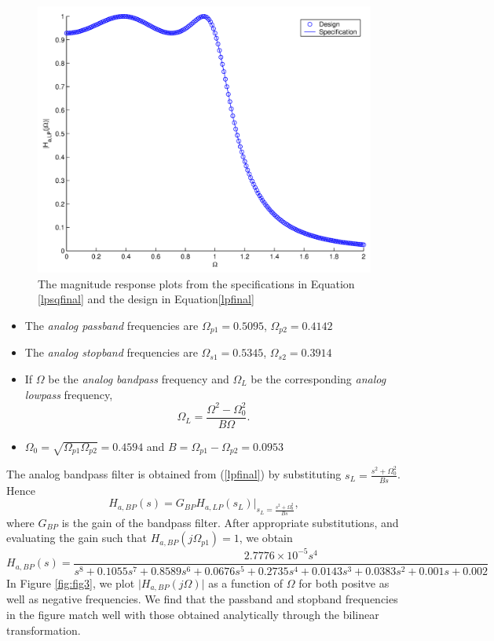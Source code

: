 \documentclass[journal,12pt,twocolumn]{IEEEtran}
\theoremstyle{remark}
\begin{document}
\begin{figure}[htbp] 
\centering
\includegraphics[width=1.1\columnwidth]{figs/PNG/IIR/fig2.png}
\caption{The magnitude response plots from the specifications in Equation \ref{lpsqfinal} and the design in Equation\eqref{lpfinal}}
\label{fig:fig2}
\end{figure}
 \begin{itemize}
\item The {\em analog  passband} frequencies are $\Omega_{p1} = 0.5095$, $\Omega_{p2} = 0.4142$
\item The {\em analog  stopband} frequencies are $\Omega_{s1} = 0.5345$, $\Omega_{s2} = 0.3914$
\item If $\Omega$ be the {\em analog bandpass} frequency and $\Omega_L$ be the corresponding {\em analog lowpass} frequency,
\begin{equation}
\Omega_L = \frac{\Omega^2 - \Omega_0^2}{B\Omega}.
\end{equation}

\item $\Omega_0 = \sqrt{\Omega_{p1}\Omega_{p2}} = 0.4594$ and $B = \Omega_{p1} - \Omega_{p2} = 0.0953$
\end{itemize}

The analog bandpass filter is obtained from (\ref{lpfinal}) by substituting
$s_L = \frac{s^2 + \Omega_0^2}{Bs}$.  Hence
\begin{equation}
H_{a,BP}(s) = G_{BP}H_{a,LP}(s_L)\vert_{s_L = \frac{s^2 + \Omega_0^2}{Bs}},
\end{equation}
where $G_{BP}$ is the gain of the bandpass filter.  After appropriate substitutions, and evaluating the gain 
such that $H_{a,BP}(j\Omega_{p1}) = 1$, we obtain
{\tiny
\begin{equation}
\label{bpfinal}
H_{a,BP}(s) = \frac{2.7776\times 10^{-5}s^4}{s^8+0.1055s^7+0.8589s^6+0.0676s^5+0.2735s^4+0.0143s^3+0.0383s^2+0.001s+0.002}
\end{equation}
}
In Figure \eqref{fig:fig3}, we plot $\vert H_{a,BP}(j\Omega)\vert$ as a function of $\Omega$ for both positve as
well as negative frequencies.  We find that the passband and stopband frequencies in the figure
match well with those obtained analytically through the bilinear transformation.
\end{document}
